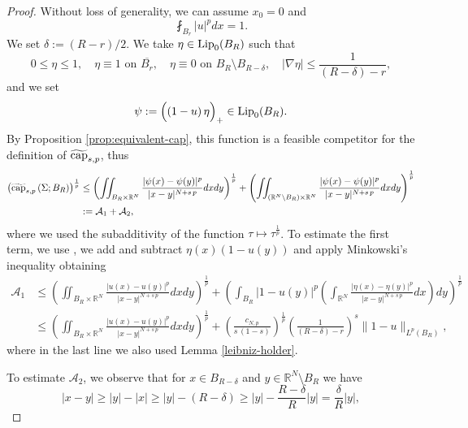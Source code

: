 \documentclass{amsart}
\theoremstyle{definition}
\numberwithin{equation}{section}
\begin{document}
\begin{proof}
	Without loss of generality, we can assume $x_0=0$ and 
	\begin{equation} \label{hp:normalizzazione}
		\fint_{B_r} |u|^p dx = 1.
	\end{equation} 
	We set 
	$
	\delta:= (R-r)/2.
	$
	We take $\eta \in {\rm Lip}_0(B_{R})$ such that 
	\begin{equation} \label{eqn:cut-off-prop}
		0 \leq \eta \leq 1, \quad \eta \equiv 1 \mbox{ on } \overline{B_{r}}, \quad \eta \equiv 0 \mbox{ on } B_{R} \setminus B_{R-\delta}, \quad |\nabla \eta| \leq \frac{1}{(R- \delta)-r}, 
	\end{equation}
	and we set 
	\[
	\psi:= \Big((1-u)\,\eta\Big)_{+} \in {\rm Lip}_0(B_{R}). 
	\]
	By Proposition \ref{prop:equivalent-cap}, this function is a feasible competitor for the definition of $\widetilde{\rm cap}_{s,p}$, thus 
	\[
	\begin{split}
		\left(\widetilde{\rm cap}_{s,p}\left(\Sigma; B_{R}\right)\right)^{\frac{1}{p}} &\le \left(\iint_{B_{R} \times \mathbb{R}^N} \frac{|\psi(x) - \psi(y)|^p}{|x-y|^{N+s\,p}}dxdy\right)^{\frac{1}{p}} 
		+ \left(\iint_{\left(\mathbb{R}^N \setminus B_{R}\right) \times \mathbb{R}^N} \frac{|\psi(x) - \psi(y)|^{p}}{|x-y|^{N+s\,p}}dxdy\right)^{\frac{1}{p}} \\ &:= \mathcal{A}_1 + \mathcal{A}_2,
	\end{split}
	\] 
	where we used the subadditivity of the function $\tau \mapsto \tau^{\frac{1}{p}}$. To estimate the first term, we use \cite[Lemma 2.6(b)]{Warma}, we add and subtract $\eta(x)(1-u(y))$ and apply Minkowski's inequality obtaining 
	\[
	\begin{split}
		\mathcal{A}_1 &\le \left(\iint_{B_{R} \times \mathbb{R}^N} \frac{|u(x) - u(y)|^p}{|x-y|^{N+s\,p}}dxdy \right)^{\frac{1}{p}} + \left(\int_{B_{R}} |1-u(y)|^p\left(\int_{\mathbb{R}^N} \frac{|\eta(x) - \eta(y)|^p}{|x-y|^{N+s\,p}}dx\right)dy\right)^{\frac{1}{p}} \\
		&\le \left(\iint_{B_{R} \times \mathbb{R}^N} \frac{|u(x) - u(y)|^p}{|x-y|^{N+s\,p}}dxdy \right)^{\frac{1}{p}}  + \left(\frac{c_{N,p}}{s\,(1-s)}\right)^{\frac{1}{p}} \left(\frac{1}{(R-\delta)-r}\right)^s \|1- u\|_{L^p(B_{R})},
	\end{split}
	\]
	where in the last line we also used Lemma \ref{leibniz-holder}.
	\par 
	To estimate $\mathcal{A}_2$, we observe that for $x \in B_{R- \delta}$ and $y \in \mathbb{R}^N \setminus B_{R}$ we have
	\[
	|x - y| \ge |y| - |x| \ge |y| - \left(R-\delta\right) \ge |y| - \frac{R-\delta}{R}|y| = \frac{\delta}{R}|y|,
\]
\end{proof}
\end{document}
